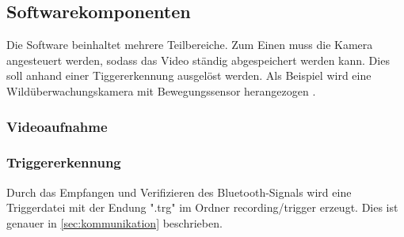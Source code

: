 \subsection{Softwarekomponenten}
\label{subsec:evalsys_software}

Die Software beinhaltet mehrere Teilbereiche. Zum Einen muss die Kamera angesteuert werden, sodass das Video ständig abgespeichert werden kann. Dies soll anhand einer Tiggererkennung ausgelöst werden. Als Beispiel wird eine Wildüberwachungskamera mit Bewegungssensor herangezogen \cite{rasp_ansteuerung}.

\subsubsection{Videoaufnahme}


\subsubsection{Triggererkennung}

Durch das Empfangen und Verifizieren des Bluetooth-Signals wird eine Triggerdatei mit der Endung ".trg" im Ordner recording/trigger erzeugt. Dies ist genauer in \ref{sec:kommunikation} beschrieben.

